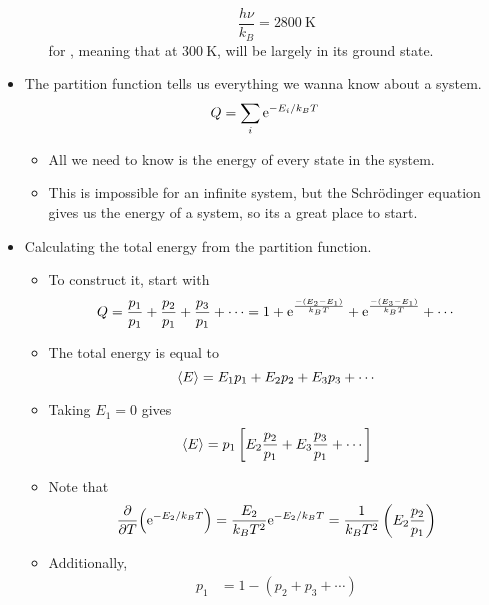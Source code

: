 \documentclass[../notes.tex]{subfiles}
\begin{document}
\begin{itemize}
\begin{itemize}
\begin{equation*}
            \frac{h\nu}{k_B} = \SI{2800}{\kelvin}
        \end{equation*}
        for , meaning that at $\SI{300}{\kelvin}$,  will be largely in its ground state.
    \end{itemize}
    \item The partition function tells us everything we wanna know about a system.
    \begin{equation*}
        Q = \sum_i\e[-E_i/k_BT]
    \end{equation*}
    \begin{itemize}
        \item All we need to know is the energy of every state in the system.
        \item This is impossible for an infinite system, but the Schr\"{o}dinger equation gives us the energy of a system, so its a great place to start.
    \end{itemize}
    \item Calculating the total energy from the partition function.
    \begin{itemize}
        \item To construct it, start with
        \begin{equation*}
            Q = \frac{p_1}{p_1}+\frac{p_2}{p_1}+\frac{p_3}{p_1}+\cdots
            = 1+\e[\frac{-(E_2-E_1)}{k_BT}]+\e[\frac{-(E_3-E_1)}{k_BT}]+\cdots
        \end{equation*}
        \item The total energy is equal to
        \begin{equation*}
            \prb{E} = E_1p_1+E_2p_2+E_3p_3+\cdots
        \end{equation*}
        \item Taking $E_1=0$ gives
        \begin{equation*}
            \prb{E} = p_1\left[ E_2\frac{p_2}{p_1}+E_3\frac{p_3}{p_1}+\cdots \right]
        \end{equation*}
        \item Note that
        \begin{equation*}
            \pdv{T}(\e[-E_2/k_BT]) = \frac{E_2}{k_BT^2}\e[-E_2/k_BT]
            = \frac{1}{k_BT^2}\left( E_2\frac{p_2}{p_1} \right)
        \end{equation*}
        \item Additionally,
        \begin{align*}
            p_1 &= 1-(p_2+p_3+\cdots)\\

\end{align*}
\end{itemize}
\end{itemize}
\end{document}
